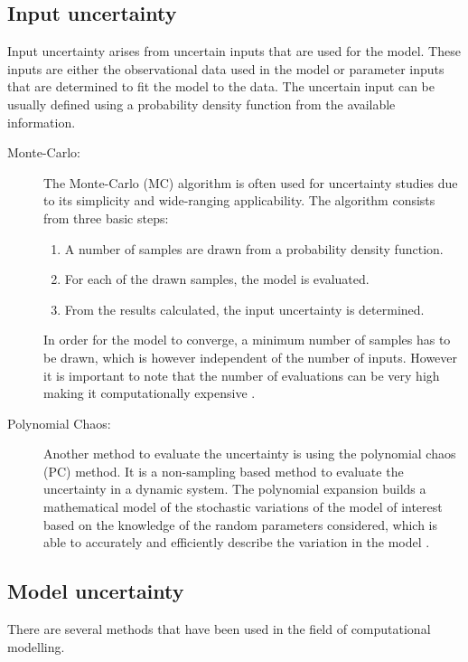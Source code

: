 \subsection{Input uncertainty}
Input uncertainty arises from uncertain inputs that are used for the model. These inputs are either the observational data used in the model or parameter inputs that are determined to fit the model to the data. The uncertain input can be usually defined using a probability density function from the available information.\par
\begin{description}
\item[Monte-Carlo:]
The Monte-Carlo (MC) algorithm is often used for uncertainty studies due to its simplicity and wide-ranging applicability. The algorithm consists from three basic steps:
\begin{enumerate}
    \item A number of samples are drawn from a probability density function.
    \item For each of the drawn samples, the model is evaluated.
    \item From the results calculated, the input uncertainty is determined.
\end{enumerate}
In order for the model to converge, a minimum number of samples has to be drawn, which is however independent of the number of inputs. However it is important to note that the number of evaluations can be very high making it computationally expensive \cite{Eck2016AApplications,Sudret2007UncertaintyMethods}. 

\item[Polynomial Chaos:]
Another method to evaluate the uncertainty is using the polynomial chaos (PC) method. It is a non-sampling based method to evaluate the uncertainty in a dynamic system. The polynomial expansion builds a mathematical model of the stochastic variations of the model of interest based on the knowledge of the random parameters considered, which is able to accurately and efficiently describe the variation in the model \cite{Sudret2007UncertaintyMethods}.
\end{description}
\subsection{Model uncertainty}
There are several methods that have been used in the field of computational modelling.

